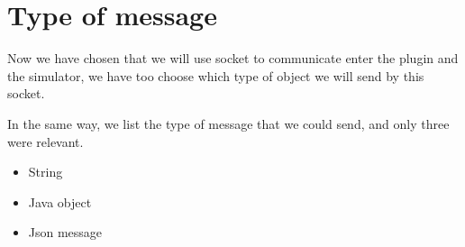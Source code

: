 







\section{Type of message}

Now we have chosen that we will use socket to communicate enter the plugin and the simulator, we have too choose which type of object we will send by this socket.

In the same way, we list the type of message that we could send, and only three were relevant.

\begin{itemize}
\item String
\item Java object
\item Json message
\end{itemize}

